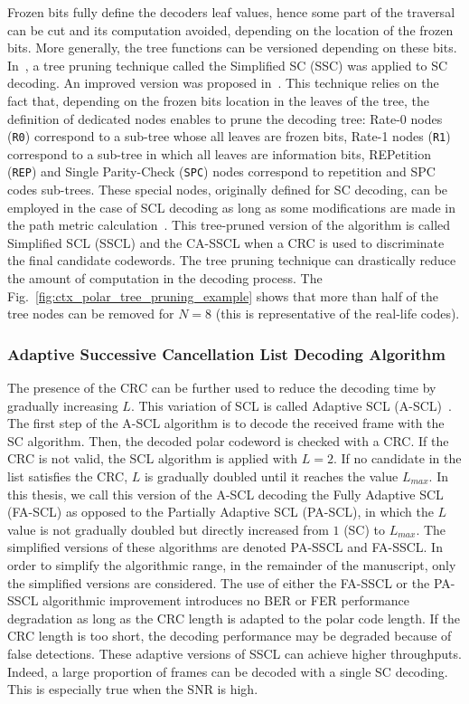 Frozen bits fully define the decoders leaf values, hence some part of the
traversal can be cut and its computation avoided, depending on the location of
the frozen bits. More generally, the tree functions can be versioned depending
on these bits. In~\cite{Alamdar-Yazdi2011}, a tree pruning technique called the
Simplified SC (SSC) was applied to SC decoding. An improved version was proposed
in~\cite{Sarkis2014a}. This technique relies on the fact that, depending on the
frozen bits location in the leaves of the tree, the definition of dedicated
nodes enables to prune the decoding tree: Rate-0 nodes (\verb|R0|) correspond to
a sub-tree whose all leaves are frozen bits, Rate-1 nodes (\verb|R1|) correspond
to a sub-tree in which all leaves are information bits, REPetition (\verb|REP|)
and Single Parity-Check (\verb|SPC|) nodes correspond to repetition and SPC
codes sub-trees. These special nodes, originally defined for SC decoding, can be
employed in the case of SCL decoding as long as some modifications are made in
the path metric calculation~\cite{Sarkis2016}. This tree-pruned version of the
algorithm is called Simplified SCL (SSCL) and the CA-SSCL when a CRC is used to
discriminate the final candidate codewords. The tree pruning technique can
drastically reduce the amount of computation in the decoding process. The
Fig.~\ref{fig:ctx_polar_tree_pruning_example} shows that more than half of the
tree nodes can be removed for $N = 8$ (this is representative of the real-life
codes).

\subsubsection{Adaptive Successive Cancellation List Decoding Algorithm}

The presence of the CRC can be further used to reduce the decoding time by
gradually increasing $L$. This variation of SCL is called Adaptive SCL
(A-SCL)~\cite{Li2012}. The first step of the A-SCL algorithm is to decode the
received frame with the SC algorithm. Then, the decoded polar codeword is
checked with a CRC. If the CRC is not valid, the SCL algorithm is applied with
$L=2$. If no candidate in the list satisfies the CRC, $L$ is gradually doubled
until it reaches the value $L_{max}$. In this thesis, we call this version of
the A-SCL decoding the Fully Adaptive SCL (FA-SCL) as opposed to the Partially
Adaptive SCL (PA-SCL), in which the $L$ value is not gradually doubled but
directly increased from $1$ (SC) to $L_{max}$. The simplified versions of these
algorithms are denoted PA-SSCL and FA-SSCL. In order to simplify the algorithmic
range, in the remainder of the manuscript, only the simplified versions are
considered. The use of either the FA-SSCL or the PA-SSCL algorithmic improvement
introduces no BER or FER performance degradation as long as the CRC length is
adapted to the polar code length. If the CRC length is too short, the decoding
performance may be degraded because of false detections. These adaptive versions
of SSCL can achieve higher throughputs. Indeed, a large proportion of frames can
be decoded with a single SC decoding. This is especially true when the SNR is
high.

